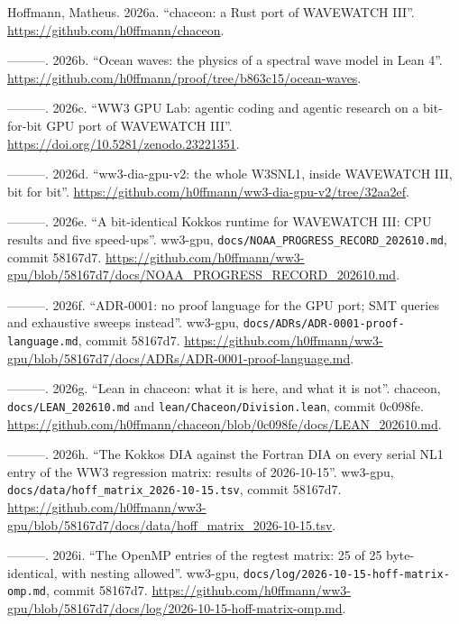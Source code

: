 \documentclass[10pt,a4paper,]{article}
\newlength{\cslhangindent}
\newenvironment{CSLReferences}[2] %
 {\small\begin{list}{}{%
  \setlength{\itemindent}{0pt}
  \setlength{\leftmargin}{0pt}
  \setlength{\parsep}{0pt}
  \ifodd #1
   \setlength{\leftmargin}{\cslhangindent}
   \setlength{\itemindent}{-1\cslhangindent}
  \fi
  \setlength{\itemsep}{#2\baselineskip}}}
 {\end{list}}
\begin{document}
\protect{}\label{refs}
\begin{CSLReferences}{1}{0}
Hoffmann, Matheus. 2026a. {``{chaceon}: a {Rust} port of {WAVEWATCH
III}''}. \url{https://github.com/h0ffmann/chaceon}.

---------. 2026b. {``Ocean waves: the physics of a spectral wave model
in {Lean} 4''}.
\url{https://github.com/h0ffmann/proof/tree/b863c15/ocean-waves}.

---------. 2026c. {``{WW3 GPU Lab}: agentic coding and agentic research
on a bit-for-bit {GPU} port of {WAVEWATCH III}''}.
\url{https://doi.org/10.5281/zenodo.23221351}.

---------. 2026d. {``{ww3-dia-gpu-v2}: the whole {W3SNL1}, inside
{WAVEWATCH III}, bit for bit''}.
\url{https://github.com/h0ffmann/ww3-dia-gpu-v2/tree/32aa2ef}.

---------. 2026e. {``A bit-identical {Kokkos} runtime for {WAVEWATCH
III}: {CPU} results and five speed-ups''}. ww3-gpu,
\texttt{docs/NOAA\_PROGRESS\_RECORD\_202610.md}, commit 58167d7.
\url{https://github.com/h0ffmann/ww3-gpu/blob/58167d7/docs/NOAA_PROGRESS_RECORD_202610.md}.

---------. 2026f. {``{ADR-0001}: no proof language for the {GPU} port;
{SMT} queries and exhaustive sweeps instead''}. ww3-gpu,
\texttt{docs/ADRs/ADR-0001-proof-language.md}, commit 58167d7.
\url{https://github.com/h0ffmann/ww3-gpu/blob/58167d7/docs/ADRs/ADR-0001-proof-language.md}.

---------. 2026g. {``Lean in chaceon: what it is here, and what it is
not''}. chaceon, \texttt{docs/LEAN\_202610.md} and
\texttt{lean/Chaceon/Division.lean}, commit 0c098fe.
\url{https://github.com/h0ffmann/chaceon/blob/0c098fe/docs/LEAN_202610.md}.

---------. 2026h. {``The {Kokkos} {DIA} against the {Fortran} {DIA} on
every serial {NL1} entry of the {WW3} regression matrix: results of
2026-10-15''}. ww3-gpu, \texttt{docs/data/hoff\_matrix\_2026-10-15.tsv},
commit 58167d7.
\url{https://github.com/h0ffmann/ww3-gpu/blob/58167d7/docs/data/hoff_matrix_2026-10-15.tsv}.

---------. 2026i. {``The {OpenMP} entries of the regtest matrix: 25 of
25 byte-identical, with nesting allowed''}. ww3-gpu,
\texttt{docs/log/2026-10-15-hoff-matrix-omp.md}, commit 58167d7.
\url{https://github.com/h0ffmann/ww3-gpu/blob/58167d7/docs/log/2026-10-15-hoff-matrix-omp.md}.


\end{CSLReferences}
\end{document}
